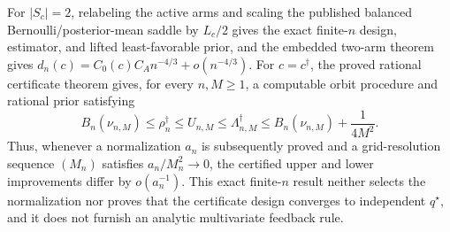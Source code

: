 For \(|S_c|=2\), relabeling the active arms and scaling the published balanced Bernoulli/posterior-mean saddle by \(L_c/2\) gives the exact finite-\(n\) design, estimator, and lifted least-favorable prior, and the embedded two-arm theorem gives \(d_n(c)=C_0(c)C_A n^{-4/3}+o(n^{-4/3})\). For \(c=c^\dagger\), the proved rational certificate theorem gives, for every \(n,M\geq1\), a computable orbit procedure and rational prior satisfying
\[
 B_n(\nu_{n,M})\leq\rho_n^\dagger\leq U_{n,M}
 \leq\Lambda_{n,M}^\dagger
 \leq B_n(\nu_{n,M})+\frac{1}{4M^2}.
\]
Thus, whenever a normalization \(a_n\) is subsequently proved and a grid-resolution sequence \((M_n)\) satisfies \(a_n/M_n^2\to0\), the certified upper and lower improvements differ by \(o(a_n^{-1})\). This exact finite-\(n\) result neither selects the normalization nor proves that the certificate design converges to independent \(q^\star\), and it does not furnish an analytic multivariate feedback rule.